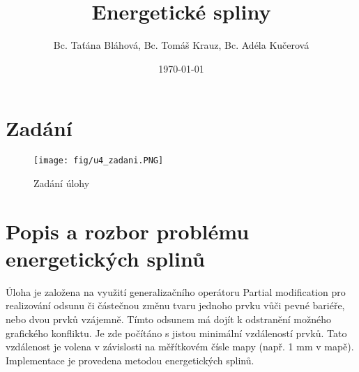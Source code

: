 \documentclass[oneside,12pt,a4paper]{book}
\title{Energetické spliny}
\author{Bc. Taťána Bláhová, Bc. Tomáš Krauz, Bc. Adéla Kučerová}
\date{\today} %
\begin{document}
\maketitle

    \vspace{-2cm}
    \vfill
    \begingroup
    
    \tableofcontents
    \vspace{-0.5cm}
    \printglossary[type=\acronymtype,title=\Large Acronyms]
    \endgroup
    \vspace{-1cm}
% 


\clearpage
\chapter{Zadání}

\begin{figure}[ht!]
    \centering
    \texttt{[image: fig/u4\_zadani.PNG]}
    \caption{Zadání úlohy}
    \label{fig:Zadání úlohy}
\end{figure}








\chapter{Popis a rozbor problému energetických splinů} 
Úloha je založena na využití generalizačního operátoru Partial modification pro realizování odsunu či částečnou změnu tvaru jednoho prvku vůči pevné bariéře, nebo dvou prvků vzájemně. Tímto odsunem má dojít k odstranění možného grafického konfliktu. Je zde počítáno s jistou minimální vzdáleností prvků. Tato vzdálenost je volena v závislosti na měřítkovém čísle mapy (např. 1 mm v mapě). Implementace je provedena metodou energetických splinů.\par
\end{document}
